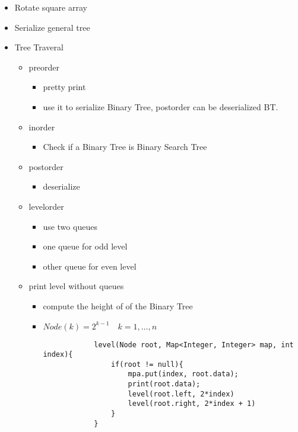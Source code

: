\documentclass{article}
\begin{document}
\begin{enumerate}
\begin{itemize}
\begin{itemize}
\begin{itemize}
\begin{verbatim}
    \end{verbatim} 
    \end{itemize} 
    \item Rotate square array

    \item Serialize general tree 
    \item Tree Traveral
        \begin{itemize}
        \item preorder  
            \begin{itemize}
            \item pretty print
            \item use it to serialize Binary Tree, postorder can be deserialized BT.
            \end{itemize} 
        \item inorder 

            \begin{itemize}
            \item Check if a Binary Tree is Binary Search Tree   
            \end{itemize} 

        \item postorder
        \begin{itemize}
         \item deserialize  
        \end{itemize}

        
        \item levelorder 
            \begin{itemize}
             \item use two queues 
             \item one queue for odd level
             \item other queue for even level
            \end{itemize}
        \item print level without queues
        \begin{itemize}
         \item compute the height of of the Binary Tree 
         \item $Node(k) = 2^{k-1} \quad k = 1 , \dots , n$
         \begin{verbatim}
            level(Node root, Map<Integer, Integer> map, int index){
                if(root != null){
                    mpa.put(index, root.data);
                    print(root.data);
                    level(root.left, 2*index)
                    level(root.right, 2*index + 1)
                }
            } 


\end{verbatim}
\end{itemize}
\end{itemize}
\end{itemize}
\end{itemize}
\end{enumerate}
\end{document}
